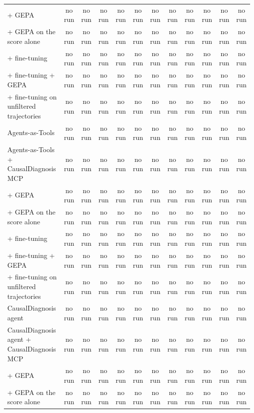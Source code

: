 \documentclass[10pt]{article}
\begin{document}
\begin{table}[H]
\begin{tabular}{lccccccccccc}
\quad + GEPA & no run & no run & no run & no run & no run & no run & no run & no run & no run & no run & no run \\
\quad + GEPA on the score alone & no run & no run & no run & no run & no run & no run & no run & no run & no run & no run & no run \\
\quad + fine-tuning & no run & no run & no run & no run & no run & no run & no run & no run & no run & no run & no run \\
\quad + fine-tuning + GEPA & no run & no run & no run & no run & no run & no run & no run & no run & no run & no run & no run \\
\quad + fine-tuning on unfiltered trajectories & no run & no run & no run & no run & no run & no run & no run & no run & no run & no run & no run \\
\midrule
Agents-as-Tools & no run & no run & no run & no run & no run & no run & no run & no run & no run & no run & no run \\
Agents-as-Tools + CausalDiagnosis MCP & no run & no run & no run & no run & no run & no run & no run & no run & no run & no run & no run \\
\quad + GEPA & no run & no run & no run & no run & no run & no run & no run & no run & no run & no run & no run \\
\quad + GEPA on the score alone & no run & no run & no run & no run & no run & no run & no run & no run & no run & no run & no run \\
\quad + fine-tuning & no run & no run & no run & no run & no run & no run & no run & no run & no run & no run & no run \\
\quad + fine-tuning + GEPA & no run & no run & no run & no run & no run & no run & no run & no run & no run & no run & no run \\
\quad + fine-tuning on unfiltered trajectories & no run & no run & no run & no run & no run & no run & no run & no run & no run & no run & no run \\
\midrule
CausalDiagnosis agent & no run & no run & no run & no run & no run & no run & no run & no run & no run & no run & no run \\
CausalDiagnosis agent + CausalDiagnosis MCP & no run & no run & no run & no run & no run & no run & no run & no run & no run & no run & no run \\
\quad + GEPA & no run & no run & no run & no run & no run & no run & no run & no run & no run & no run & no run \\
\quad + GEPA on the score alone & no run & no run & no run & no run & no run & no run & no run & no run & no run & no run & no run \\

\end{tabular}
\end{table}
\end{document}
